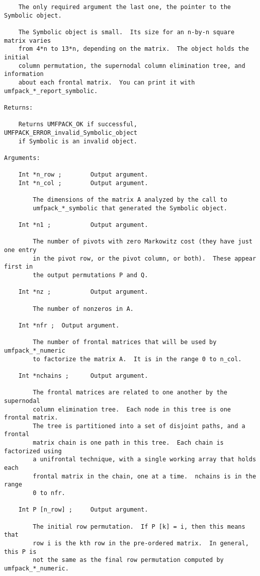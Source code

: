 \documentclass[11pt]{article}
\begin{document}
{\begin{verbatim}
    The only required argument the last one, the pointer to the Symbolic object.

    The Symbolic object is small.  Its size for an n-by-n square matrix varies
    from 4*n to 13*n, depending on the matrix.  The object holds the initial
    column permutation, the supernodal column elimination tree, and information
    about each frontal matrix.  You can print it with umfpack_*_report_symbolic.

Returns:

    Returns UMFPACK_OK if successful, UMFPACK_ERROR_invalid_Symbolic_object
    if Symbolic is an invalid object.

Arguments:

    Int *n_row ;        Output argument.
    Int *n_col ;        Output argument.

        The dimensions of the matrix A analyzed by the call to
        umfpack_*_symbolic that generated the Symbolic object.

    Int *n1 ;           Output argument.

        The number of pivots with zero Markowitz cost (they have just one entry
        in the pivot row, or the pivot column, or both).  These appear first in
        the output permutations P and Q.

    Int *nz ;           Output argument.

        The number of nonzeros in A.

    Int *nfr ;  Output argument.

        The number of frontal matrices that will be used by umfpack_*_numeric
        to factorize the matrix A.  It is in the range 0 to n_col.

    Int *nchains ;      Output argument.

        The frontal matrices are related to one another by the supernodal
        column elimination tree.  Each node in this tree is one frontal matrix.
        The tree is partitioned into a set of disjoint paths, and a frontal
        matrix chain is one path in this tree.  Each chain is factorized using
        a unifrontal technique, with a single working array that holds each
        frontal matrix in the chain, one at a time.  nchains is in the range
        0 to nfr.

    Int P [n_row] ;     Output argument.

        The initial row permutation.  If P [k] = i, then this means that
        row i is the kth row in the pre-ordered matrix.  In general, this P is
        not the same as the final row permutation computed by umfpack_*_numeric.


\end{verbatim}}
\end{document}
